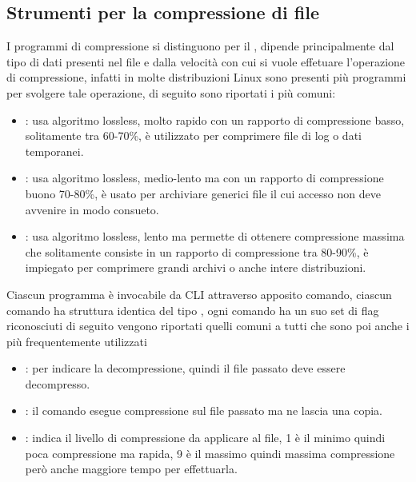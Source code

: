 \subsection{Strumenti per la compressione di file}
\label{subsec:Strumenti-per-la-compressione-di-file}
I programmi di compressione si distinguono per il , dipende principalmente dal tipo di dati presenti nel file e dalla velocità con cui si vuole effetuare l'operazione di compressione, infatti in molte distribuzioni Linux sono presenti più programmi per svolgere tale operazione, di seguito sono riportati i più comuni:
\begin{itemize}
    \item {}: usa algoritmo lossless, molto rapido con un rapporto di compressione basso, solitamente tra 60-70\%, è utilizzato per comprimere file di log o dati temporanei. 
    \item {}: usa algoritmo lossless, medio-lento ma con un rapporto di compressione buono 70-80\%, è usato per archiviare generici file il cui accesso non deve avvenire in modo consueto. 
    \item {}: usa algoritmo lossless, lento ma permette di ottenere compressione massima che solitamente consiste in un rapporto di compressione tra 80-90\%, è impiegato per comprimere grandi archivi o anche intere distribuzioni.
\end{itemize}
Ciascun programma è invocabile da CLI attraverso apposito comando, ciascun comando ha struttura identica del tipo , ogni comando ha un suo set di flag riconosciuti di seguito vengono riportati quelli comuni a tutti che sono poi anche i più frequentemente utilizzati
\begin{itemize}
    \item {}: per indicare la decompressione, quindi il file passato deve essere decompresso.
    \item {}: il comando esegue compressione sul file passato ma ne lascia una copia.
    \item \tc{-[1-9]}: indica il livello di compressione da applicare al file, 1 è il minimo quindi poca compressione ma rapida, 9 è il massimo quindi massima compressione però anche maggiore tempo per effettuarla.
\end{itemize}
